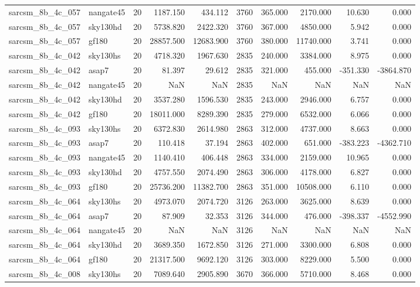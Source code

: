 \documentclass{article}
\begin{document}
\begin{longtable}{llrrrrrrrr}
sarcsm\_8b\_4c\_057 & nangate45 & 20 & 1187.150 & 434.112 & 3760 & 365.000 & 2170.000 & 10.630 & 0.000 \\
sarcsm\_8b\_4c\_057 & sky130hd & 20 & 5738.820 & 2422.320 & 3760 & 367.000 & 4850.000 & 5.942 & 0.000 \\
sarcsm\_8b\_4c\_057 & gf180 & 20 & 28857.500 & 12683.900 & 3760 & 380.000 & 11740.000 & 3.741 & 0.000 \\
sarcsm\_8b\_4c\_042 & sky130hs & 20 & 4718.320 & 1967.630 & 2835 & 240.000 & 3384.000 & 8.975 & 0.000 \\
sarcsm\_8b\_4c\_042 & asap7 & 20 & 81.397 & 29.612 & 2835 & 321.000 & 455.000 & -351.330 & -3864.870 \\
sarcsm\_8b\_4c\_042 & nangate45 & 20 & NaN & NaN & 2835 & NaN & NaN & NaN & NaN \\
sarcsm\_8b\_4c\_042 & sky130hd & 20 & 3537.280 & 1596.530 & 2835 & 243.000 & 2946.000 & 6.757 & 0.000 \\
sarcsm\_8b\_4c\_042 & gf180 & 20 & 18011.000 & 8289.390 & 2835 & 279.000 & 6532.000 & 6.066 & 0.000 \\
sarcsm\_8b\_4c\_093 & sky130hs & 20 & 6372.830 & 2614.980 & 2863 & 312.000 & 4737.000 & 8.663 & 0.000 \\
sarcsm\_8b\_4c\_093 & asap7 & 20 & 110.418 & 37.194 & 2863 & 402.000 & 651.000 & -383.223 & -4362.710 \\
sarcsm\_8b\_4c\_093 & nangate45 & 20 & 1140.410 & 406.448 & 2863 & 334.000 & 2159.000 & 10.965 & 0.000 \\
sarcsm\_8b\_4c\_093 & sky130hd & 20 & 4757.550 & 2074.490 & 2863 & 306.000 & 4178.000 & 6.827 & 0.000 \\
sarcsm\_8b\_4c\_093 & gf180 & 20 & 25736.200 & 11382.700 & 2863 & 351.000 & 10508.000 & 6.110 & 0.000 \\
sarcsm\_8b\_4c\_064 & sky130hs & 20 & 4973.070 & 2074.720 & 3126 & 263.000 & 3625.000 & 8.639 & 0.000 \\
sarcsm\_8b\_4c\_064 & asap7 & 20 & 87.909 & 32.353 & 3126 & 344.000 & 476.000 & -398.337 & -4552.990 \\
sarcsm\_8b\_4c\_064 & nangate45 & 20 & NaN & NaN & 3126 & NaN & NaN & NaN & NaN \\
sarcsm\_8b\_4c\_064 & sky130hd & 20 & 3689.350 & 1672.850 & 3126 & 271.000 & 3300.000 & 6.808 & 0.000 \\
sarcsm\_8b\_4c\_064 & gf180 & 20 & 21317.500 & 9692.120 & 3126 & 303.000 & 8229.000 & 5.500 & 0.000 \\
sarcsm\_8b\_4c\_008 & sky130hs & 20 & 7089.640 & 2905.890 & 3670 & 366.000 & 5710.000 & 8.468 & 0.000 \\

\end{longtable}
\end{document}
